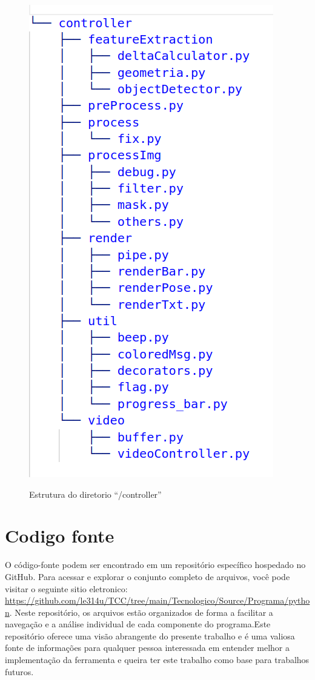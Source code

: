 \begin{figure}[H]
	\centering
    \caption{Estrutura do diretorio ``/controller''}
	\includegraphics[scale=0.6]{figuras/diretorios/controller.png}
	\label{fig:controller}
\end{figure}



\section[Codigo fonte]{Codigo fonte}

O código-fonte podem ser encontrado em um repositório específico hospedado no GitHub. Para acessar e explorar o conjunto completo de arquivos, você pode visitar o seguinte sitio eletronico: \url{https://github.com/le314u/TCC/tree/main/Tecnologico/Source/Programa/python}. Neste repositório, os arquivos estão organizados de forma a facilitar a navegação e a análise individual de cada componente do programa.Este repositório oferece uma visão abrangente do presente trabalho e é uma valiosa fonte de informações para qualquer pessoa interessada em entender melhor a implementação da ferramenta e queira ter este trabalho como base para trabalhos futuros.


